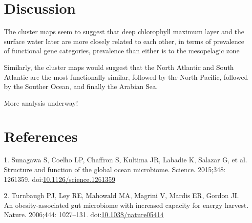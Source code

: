 \documentclass[12pt,a4paper,]{article}
\begin{document}
\section{Discussion}\label{discussion}

The cluster maps seem to suggest that deep chlorophyll maximum layer and
the surface water later are more closely related to each other, in terms
of prevalence of functional gene categories, prevalence than either is
to the mesopelagic zone

Similarly, the cluster maps would suggest that the North Atlantic and
South Atlantic are the most functionally similar, followed by the North
Pacific, followed by the Souther Ocean, and finally the Arabian Sea.

More analysis underway!

\section*{References}\label{references}

\hypertarget{refs}{}
\hypertarget{ref-sunagawa_structure_2015}{}
1. Sunagawa S, Coelho LP, Chaffron S, Kultima JR, Labadie K, Salazar G,
et al. Structure and function of the global ocean microbiome. Science.
2015;348: 1261359.
doi:\href{https://doi.org/10.1126/science.1261359}{10.1126/science.1261359}

\hypertarget{ref-turnbaugh_obesity-associated_2006}{}
2. Turnbaugh PJ, Ley RE, Mahowald MA, Magrini V, Mardis ER, Gordon JI.
An obesity-associated gut microbiome with increased capacity for energy
harvest. Nature. 2006;444: 1027--131.
doi:\href{https://doi.org/10.1038/nature05414}{10.1038/nature05414}
\end{document}
